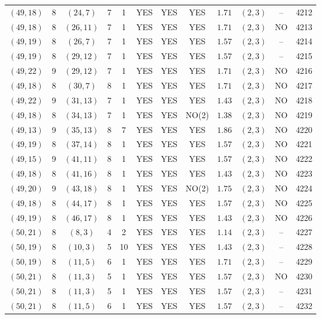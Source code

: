 \begin{longtable}{|c|c|c|c|c|c|c|c|c|c|c|c|}
$(49,18)$ & 8 & $(24,7)$ & 7 & 1 & YES & YES & YES & $1.71$ & $(2,3)$ & -- & 4212\\
$(49,18)$ & 8 & $(26,11)$ & 7 & 1 & YES & YES & YES & $1.71$ & $(2,3)$ & NO & 4213\\
$(49,19)$ & 8 & $(26,7)$ & 7 & 1 & YES & YES & YES & $1.57$ & $(2,3)$ & -- & 4214\\
$(49,19)$ & 8 & $(29,12)$ & 7 & 1 & YES & YES & YES & $1.57$ & $(2,3)$ & -- & 4215\\
$(49,22)$ & 9 & $(29,12)$ & 7 & 1 & YES & YES & YES & $1.71$ & $(2,3)$ & NO & 4216\\
$(49,18)$ & 8 & $(30,7)$ & 8 & 1 & YES & YES & YES & $1.71$ & $(2,3)$ & NO & 4217\\
$(49,22)$ & 9 & $(31,13)$ & 7 & 1 & YES & YES & YES & $1.43$ & $(2,3)$ & NO & 4218\\
$(49,18)$ & 8 & $(34,13)$ & 7 & 1 & YES & YES & NO(2) & $1.38$ & $(2,3)$ & NO & 4219\\
$(49,13)$ & 9 & $(35,13)$ & 8 & 7 & YES & YES & YES & $1.86$ & $(2,3)$ & NO & 4220\\
$(49,19)$ & 8 & $(37,14)$ & 8 & 1 & YES & YES & YES & $1.57$ & $(2,3)$ & NO & 4221\\
$(49,15)$ & 9 & $(41,11)$ & 8 & 1 & YES & YES & YES & $1.57$ & $(2,3)$ & NO & 4222\\
$(49,18)$ & 8 & $(41,16)$ & 8 & 1 & YES & YES & YES & $1.43$ & $(2,3)$ & NO & 4223\\
$(49,20)$ & 9 & $(43,18)$ & 8 & 1 & YES & YES & NO(2) & $1.75$ & $(2,3)$ & NO & 4224\\
$(49,18)$ & 8 & $(44,17)$ & 8 & 1 & YES & YES & YES & $1.57$ & $(2,3)$ & NO & 4225\\
$(49,19)$ & 8 & $(46,17)$ & 8 & 1 & YES & YES & YES & $1.43$ & $(2,3)$ & NO & 4226\\
$(50,21)$ & 8 & $(8,3)$ & 4 & 2 & YES & YES & YES & $1.14$ & $(2,3)$ & -- & 4227\\
$(50,19)$ & 8 & $(10,3)$ & 5 & 10 & YES & YES & YES & $1.43$ & $(2,3)$ & -- & 4228\\
$(50,19)$ & 8 & $(11,5)$ & 6 & 1 & YES & YES & YES & $1.71$ & $(2,3)$ & -- & 4229\\
$(50,21)$ & 8 & $(11,3)$ & 5 & 1 & YES & YES & YES & $1.57$ & $(2,3)$ & NO & 4230\\
$(50,21)$ & 8 & $(11,3)$ & 5 & 1 & YES & YES & YES & $1.57$ & $(2,3)$ & -- & 4231\\
$(50,21)$ & 8 & $(11,5)$ & 6 & 1 & YES & YES & YES & $1.57$ & $(2,3)$ & -- & 4232\\

\end{longtable}
